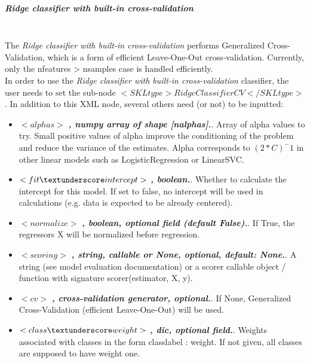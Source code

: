 \subparagraph{Ridge classifier with built-in cross-validation}
\mbox{}
\\The \textit{Ridge classifier with built-in cross-validation} performs Generalized Cross-Validation, which is a form of efficient Leave-One-Out cross-validation. Currently, only the n\textunderscore features > n\textunderscore samples case is handled efficiently.
\\In order to use the \textit{Ridge classifier with built-in cross-validation} classifier, the user needs to set the sub-node $<SKLtype>RidgeClassifierCV</SKLtype>$.
In addition to this XML node, several others need (or not) to be inputted:
\begin{itemize}
  \item $<alphas>$ \textbf{\textit{, numpy array of shape [n\textunderscore alphas].}}. Array of alpha values to try. Small positive values of alpha improve the conditioning of the problem and reduce the variance of the estimates. Alpha corresponds to $(2*C)^-1$ in other linear models such as LogisticRegression or LinearSVC.
  \item $<fit\textunderscore intercept>$ \textbf{\textit{, boolean.}}. Whether to calculate the intercept for this model. If set to false, no intercept will be used in calculations (e.g. data is expected to be already centered).
  \item $<normalize>$ \textbf{\textit{, boolean, optional field (default False).}}. If True, the regressors X will be normalized before regression.
  \item $<scoring>$ \textbf{\textit{, string, callable or None, optional, default: None.}}. A string (see model evaluation documentation) or a scorer callable object / function with signature scorer(estimator, X, y).
  \item $<cv>$ \textbf{\textit{, cross-validation generator, optional.}}. If None, Generalized Cross-Validation (efficient Leave-One-Out) will be used.
  \item $<class\textunderscore weight>$ \textbf{\textit{, dic, optional field.}}. Weights associated with classes in the form {class\textunderscore label : weight}. If not given, all classes are supposed to have weight one.
\end{itemize}

